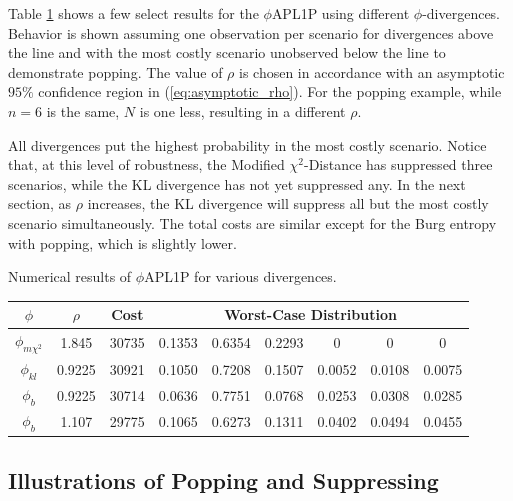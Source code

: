 \documentclass[12pt]{article}
\theoremstyle{plain}
\theoremstyle{definition}
\theoremstyle{remark}
\begin{document}
Table \ref{tb:numerical_results} shows a few select results for the $\phi$APL1P using different $\phi$-divergences.  
Behavior is shown assuming one observation per scenario for divergences above the line and with the most costly scenario unobserved below the line to demonstrate popping.
The value of $\rho$ is chosen in accordance with an asymptotic $95\%$ confidence region in (\ref{eq:asymptotic_rho}).
For the popping example, while $n=6$ is the same, $N$ is one less, resulting in a different $\rho$. 

All divergences put the highest probability in the most costly scenario. 
Notice that, at this level of robustness, the Modified $\chi^2$-Distance has suppressed three scenarios, while the KL divergence has not yet suppressed any.
In the next section, as $\rho$ increases, the KL divergence will suppress all but the most costly scenario simultaneously. 
The total costs are similar except for the Burg entropy with popping, which is slightly lower.


\begin{table}
	\TABLE
	{
		Numerical results of $\phi$APL1P for various divergences.
		\label{tb:numerical_results}
	}
	{\begin{tabular}{cc|c|cccccc}
		$\phi$ & $\rho$ & Cost & \multicolumn{6}{c}{Worst-Case Distribution} \\
		\hline
		$\phi_{m\chi^2}$ &  1.845  & 30735 & 0.1353 & 0.6354 & 0.2293 & 0      & 0      & 0 \\
		$\phi_{kl}$      &  0.9225 & 30921 & 0.1050 & 0.7208 & 0.1507 & 0.0052 & 0.0108 & 0.0075 \\
		$\phi_b$         &  0.9225 & 30714 & 0.0636 & 0.7751 & 0.0768 & 0.0253 & 0.0308 & 0.0285 \\
		\hline
		$\phi_b$         &  1.107  & 29775 & 0.1065 & 0.6273 & 0.1311 & 0.0402 & 0.0494 & 0.0455
	\end{tabular}}
	{}
\end{table}

\subsection{Illustrations of Popping and Suppressing}
\label{ssec:numerical_pop_suppress}


\end{document}
